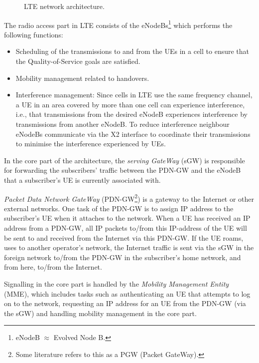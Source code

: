 \begin{figure}[htbp]
\centering
{}
\caption{\label{fig:lte_architecture}LTE network architecture.}
\end{figure}

The radio access part in LTE consists of the eNodeBs\footnote{eNodeB $\approx$ Evolved Node B.} which performs the following functions:

\begin{itemize}
%
\item Scheduling of the transmissions to and from the UEs in a cell to ensure that the Quality-of-Service goals are satisfied.
%
\item Mobility management related to handovers.
%
\item Interference management: Since cells in LTE use the same frequency channel, a UE in an area covered by more than one cell can experience interference, i.e., that transmissions from the desired eNodeB experiences interference by transmissions from another eNodeB. To reduce interference neighbour eNodeBs communicate via the X2 interface to coordinate their transmissions to minimise the interference experienced by UEs.
%
\end{itemize}

In the core part of the architecture, the \emph{serving GateWay} (sGW) is responsible for forwarding the subscribers' traffic between the PDN-GW and the eNodeB that a subscriber's UE is currently associated with. 

\emph{Packet Data Network GateWay} (PDN-GW\footnote{Some literature refers to this as a PGW (Packet GateWay).}) is a gateway to the Internet or other external networks. One task of the PDN-GW is to assign IP address to the subscriber's UE when it attaches to the network. When a UE has received an IP address from a PDN-GW, all IP packets to/from this IP-address of the UE will be sent to and received from the Internet via this PDN-GW. If the UE roams, \ie uses to another operator's network, the Internet traffic is sent via the sGW in the foreign network to/from the PDN-GW in the subscriber's home network, and from here, to/from the Internet.

Signalling in the core part is handled by the \emph{Mobility Management Entity} (MME), which includes tasks such as authenticating an UE that attempts to log on to the network, requesting an IP address for an UE from the PDN-GW (via the sGW) and handling mobility management in the core part. 


